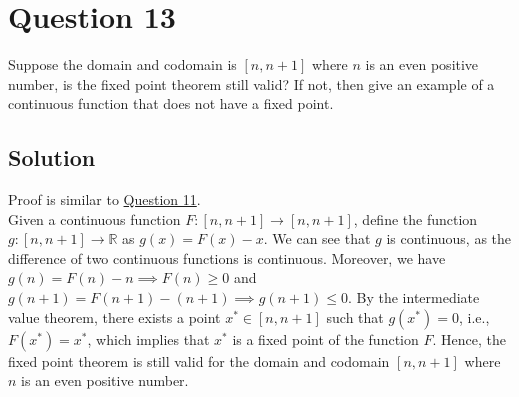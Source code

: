 \section*{Question 13}

Suppose the domain and codomain is \( [n, n+1] \) where \( n \) is an even positive number, is the fixed point theorem still valid?
If not, then give an example of a continuous function that does not have a fixed point.

\subsection*{Solution}

Proof is similar to \hyperref[sec:q11]{Question 11}.\\
Given a continuous function \( F: [n, n+1] \rightarrow [n, n+1] \), define the function \( g: [n, n+1] \rightarrow \mathbb{R} \) as \( g(x) = F(x) - x \).
We can see that \( g \) is continuous, as the difference of two continuous functions is continuous.
Moreover, we have \( g(n) = F(n) - n \implies F(n) \geq 0 \) and \( g(n+1) = F(n+1) - (n+1) \implies g(n+1) \leq 0 \).
By the intermediate value theorem, there exists a point \( x^* \in [n, n+1] \) such that \( g(x^*) = 0 \), i.e., \( F(x^*) = x^* \), which implies that \( x^* \) is a fixed point of the function \( F \).
Hence, the fixed point theorem is still valid for the domain and codomain \( [n, n+1] \) where \( n \) is an even positive number.
